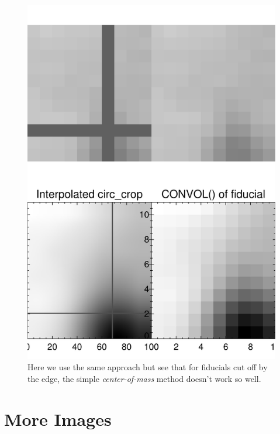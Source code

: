 \documentclass[10pt]{article}
\begin{document}
\begin{figure}[ht]
\begin{minipage}{.45\textwidth}
            \centering
                \includegraphics[width=\linewidth]{../plots_tables_images/cropcomp1.png}
                \caption{Here we use the same approach but see that for fiducials cut off by the edge, the simple \emph{center-of-mass} method doesn't work so well.}
        \end{minipage}
    \end{figure}

\newpage

\section{More Images}    
\end{document}
